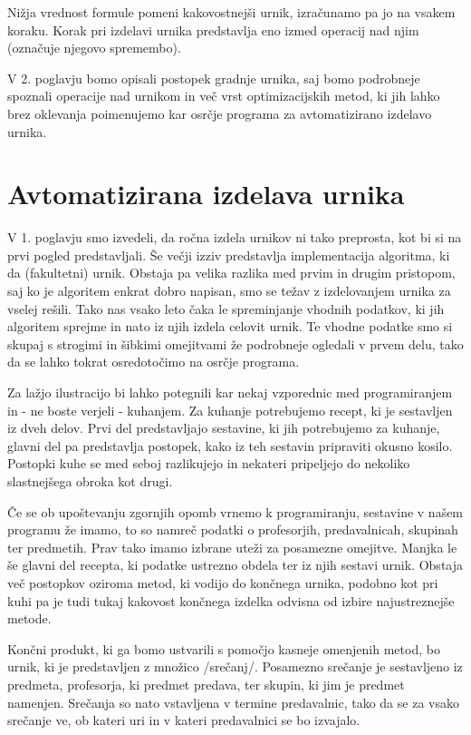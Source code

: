 \documentclass[10pt,a4paper]{article}
\begin{document}
Nižja vrednost formule pomeni kakovostnejši urnik, izračunamo pa jo na vsakem koraku.
Korak pri izdelavi urnika predstavlja eno izmed operacij nad njim (označuje njegovo
spremembo).

V 2. poglavju bomo opisali postopek gradnje urnika, saj bomo podrobneje spoznali
operacije nad urnikom in več vrst optimizacijskih metod, ki jih lahko brez oklevanja
poimenujemo kar osrčje programa za avtomatizirano izdelavo urnika.

\section{Avtomatizirana izdelava urnika} %

V 1. poglavju smo izvedeli, da ročna izdela urnikov ni tako preprosta, kot bi si
na prvi pogled predstavljali. Še večji izziv predstavlja implementacija algoritma, ki da
(fakultetni) urnik. Obstaja pa velika razlika med prvim in drugim pristopom, saj ko je
algoritem enkrat dobro napisan, smo se težav z izdelovanjem urnika za vselej rešili.
Tako nas vsako leto čaka le spreminjanje vhodnih podatkov, ki jih algoritem sprejme in
nato iz njih izdela celovit urnik. Te vhodne podatke smo si skupaj s strogimi in šibkimi
omejitvami že podrobneje ogledali v prvem delu, tako da se lahko tokrat osredotočimo na
osrčje programa.

Za lažjo ilustracijo bi lahko potegnili kar nekaj vzporednic med programiranjem in - ne
boste verjeli - kuhanjem. Za kuhanje potrebujemo recept, ki je sestavljen iz dveh delov.
Prvi del predstavljajo sestavine, ki jih potrebujemo za kuhanje, glavni del pa predstavlja
postopek, kako iz teh sestavin pripraviti okusno kosilo. Postopki kuhe se med seboj
razlikujejo in nekateri pripeljejo do nekoliko slastnejšega obroka kot drugi.

Če se ob upoštevanju zgornjih opomb vrnemo k programiranju, sestavine v našem programu že
imamo, to so namreč podatki o profesorjih, predavalnicah, skupinah ter predmetih. Prav tako
imamo izbrane uteži za posamezne omejitve. Manjka le še glavni del recepta, ki podatke
ustrezno obdela ter iz njih sestavi urnik. Obstaja več postopkov oziroma metod, ki vodijo
do končnega urnika, podobno kot pri kuhi pa je tudi tukaj kakovost končnega izdelka odvisna
od izbire najustreznejše metode.

Končni produkt, ki ga bomo ustvarili s pomočjo kasneje omenjenih metod, bo urnik, ki je
predstavljen z množico /srečanj/. Posamezno srečanje je sestavljeno iz predmeta,
profesorja, ki predmet predava, ter skupin, ki jim je predmet namenjen. Srečanja so nato
vstavljena v termine predavalnic, tako da se za vsako srečanje ve, ob kateri uri in v
kateri predavalnici se bo izvajalo.
\end{document}
